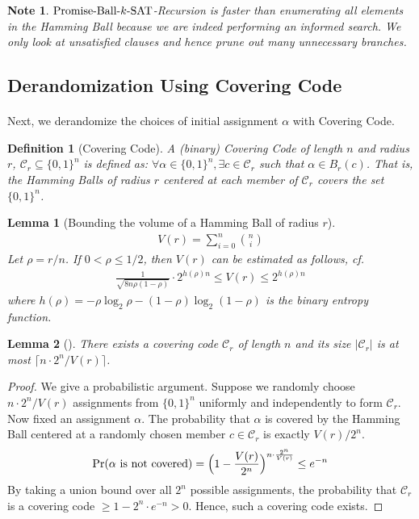 \documentclass[a4paper,12pts]{article}
\newcommand{\SAT}{\textnormal{$k$-SAT}}
\newcommand{\ball}[2]{B_{#1}(#2)}
\newcommand{\PBS}{\textnormal{Promise-Ball-$\SAT$}}
\newcommand{\cc}{\mathcal{C}}
\newcommand{\bits}{\{0,1\}}
\renewcommand{\Pr}{\textnormal{Pr}}
\newtheorem{definition}{Definition}
\newtheorem*{note}{Note}
\newtheorem{lemma}{Lemma}
\begin{document}
\begin{note}
	$\PBS$-Recursion is faster than enumerating all elements in the Hamming Ball because we are indeed performing an informed search. We only look at unsatisfied clauses and hence prune out many unnecessary branches.
\end{note}
\subsection{Derandomization Using Covering Code}
\paragraph{} Next, we derandomize the choices of initial assignment $\alpha$ with Covering Code. \par 
\begin{definition}[Covering Code]
	A (binary) Covering Code of length $n$ and radius $r$, $\cc_r \subseteq \bits^n$ is defined as: $\forall \alpha \in \bits^n, \exists c \in \cc_r$ such that $\alpha \in \ball{r}{c}$. That is, the Hamming Balls of radius $r$ centered at each member of $\cc_r$ covers the set $\bits^n$.
\end{definition}
\begin{lemma}[Bounding the volume of a Hamming Ball of radius $r$\cite{Dantsin02}]
	\begin{align*}
	V(r) = \sum_{i = 0}^{n} {n \choose i}
	\end{align*}
	Let $\rho = r/n$. If $0 < \rho \leq 1/2$, then $V(r)$ can be estimated as follows, cf. \cite[Lemma 2.4.4]{Cohen97} 
	\begin{align*}
	\frac{1}{\sqrt{8n\rho(1-\rho)}} \cdot 2^{h(\rho)n} \leq V(r) \leq 2^{h(\rho)n}
	\end{align*}
	where $h(\rho) = -\rho \log_2 \rho - (1-\rho)\log_2(1-\rho)$ is the binary entropy function.
\end{lemma}
\begin{lemma}[\cite{Dantsin02}]
	There exists a covering code $\cc_r$ of length $n$ and its size $|\cc_r|$ is at most $\lceil n\cdot 2^n / V(r) \rceil$.
\end{lemma}
\begin{proof}
	We give a probabilistic argument. Suppose we randomly choose $ n\cdot 2^n / V(r)$ assignments from $\bits^n$ uniformly and independently to form $\cc_r$. Now fixed an assignment $\alpha$. The probability that $\alpha$ is covered by the Hamming Ball centered at a randomly chosen member $c \in \cc_r$ is exactly $V(r)/2^n$. 
	\begin{align*}
	\Pr(\text{$\alpha$ is not covered}) = \Big(1-\frac{V(r)}{2^n}\Big)^{n\cdot \frac{2^n}{V(r)}} \leq e^{-n}
	\end{align*}
	By taking a union bound over all $2^n$ possible assignments, the probability that $\cc_r$ is a covering code $\geq 1 - 2^n\cdot e^{-n} > 0$. Hence, such a covering code exists. 
\end{proof}
\end{document}
